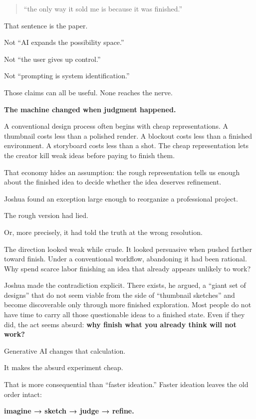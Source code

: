 \documentclass[
]{article}
\begin{document}
\begin{quote}
``the only way it sold me is because it was finished.''
\end{quote}

That sentence is the paper.

Not ``AI expands the possibility space.''

Not ``the user gives up control.''

Not ``prompting is system identification.''

Those claims can all be useful. None reaches the nerve.

\textbf{The machine changed when judgment happened.}

A conventional design process often begins with cheap representations. A
thumbnail costs less than a polished render. A blockout costs less than
a finished environment. A storyboard costs less than a shot. The cheap
representation lets the creator kill weak ideas before paying to finish
them.

That economy hides an assumption: the rough representation tells us
enough about the finished idea to decide whether the idea deserves
refinement.

Joshua found an exception large enough to reorganize a professional
project.

The rough version had lied.

Or, more precisely, it had told the truth at the wrong resolution.

The direction looked weak while crude. It looked persuasive when pushed
farther toward finish. Under a conventional workflow, abandoning it had
been rational. Why spend scarce labor finishing an idea that already
appears unlikely to work?

Joshua made the contradiction explicit. There exists, he argued, a
``giant set of designs'' that do not seem viable from the side of
``thumbnail sketches'' and become discoverable only through more
finished exploration. Most people do not have time to carry all those
questionable ideas to a finished state. Even if they did, the act seems
absurd: \textbf{why finish what you already think will not work?}

Generative AI changes that calculation.

It makes the absurd experiment cheap.

That is more consequential than ``faster ideation.'' Faster ideation
leaves the old order intact:

\textbf{imagine → sketch → judge → refine.}
\end{document}
